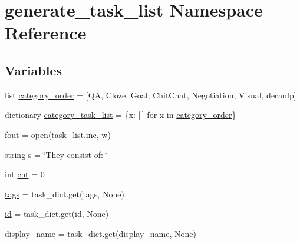 \hypertarget{namespacegenerate__task__list}{}\section{generate\+\_\+task\+\_\+list Namespace Reference}
\label{namespacegenerate__task__list}
\subsection*{Variables}
\begin{DoxyCompactItemize}
\item 
list \hyperlink{namespacegenerate__task__list_a7697d682f472185323fda0300e278233}{category\+\_\+order} = \mbox{[}\textquotesingle{}QA\textquotesingle{}, \textquotesingle{}Cloze\textquotesingle{}, \textquotesingle{}Goal\textquotesingle{}, \textquotesingle{}Chit\+Chat\textquotesingle{}, \textquotesingle{}Negotiation\textquotesingle{}, \textquotesingle{}Visual\textquotesingle{}, \textquotesingle{}decanlp\textquotesingle{}\mbox{]}
\item 
dictionary \hyperlink{namespacegenerate__task__list_a7cc034df06c75ab55d875c56f83a725b}{category\+\_\+task\+\_\+list} = \{x\+: \mbox{[}$\,$\mbox{]} for x in \hyperlink{namespacegenerate__task__list_a7697d682f472185323fda0300e278233}{category\+\_\+order}\}
\item 
\hyperlink{namespacegenerate__task__list_afa79ea1388d80fcb06dfa3aedfe47795}{fout} = open(\textquotesingle{}task\+\_\+list.\+inc\textquotesingle{}, \textquotesingle{}w\textquotesingle{})
\item 
string \hyperlink{namespacegenerate__task__list_a2ac36da11f580a75fb01969d4f8dd449}{s} = \char`\"{}They consist of\+: \char`\"{}
\item 
int \hyperlink{namespacegenerate__task__list_ae18a2eff051bd4be84f3f37eb80342fb}{cnt} = 0
\item 
\hyperlink{namespacegenerate__task__list_ad95d77ecc0bed7196aa01e9576c8ecc1}{tags} = task\+\_\+dict.\+get(\textquotesingle{}tags\textquotesingle{}, None)
\item 
\hyperlink{namespacegenerate__task__list_a78e725c3dd7e8fbdb5c3044ec1bc3a81}{id} = task\+\_\+dict.\+get(\textquotesingle{}id\textquotesingle{}, None)
\item 
\hyperlink{namespacegenerate__task__list_a5262358ec6592b8c13b3c7b7bf862865}{display\+\_\+name} = task\+\_\+dict.\+get(\textquotesingle{}display\+\_\+name\textquotesingle{}, None)
\item 

\end{DoxyCompactItemize}
